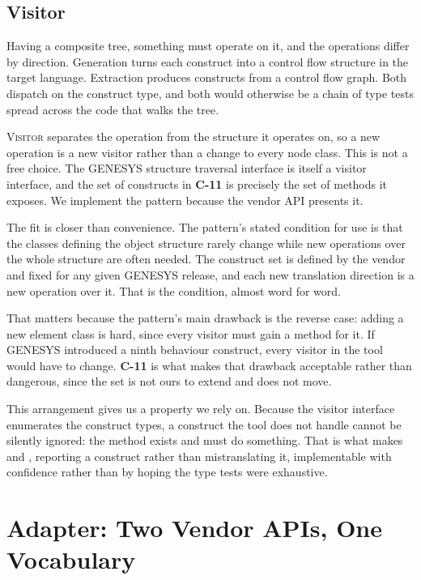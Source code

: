 \subsection{Visitor}

Having a composite tree, something must operate on it, and the operations differ
by direction. Generation turns each construct into a control flow structure in
the target language. Extraction produces constructs from a control flow graph.
Both dispatch on the construct type, and both would otherwise be a chain of type
tests spread across the code that walks the tree.

\textsc{Visitor} separates the operation from the structure it operates on, so a
new operation is a new visitor rather than a change to every node class. This is
not a free choice. The GENESYS structure traversal interface is itself a visitor
interface, and the set of constructs in \textbf{C-11} is precisely the set of
methods it exposes. We implement the pattern because the vendor API presents it.

The fit is closer than convenience. The pattern's stated condition for use is
that the classes defining the object structure rarely change while new
operations over the whole structure are often needed. The construct set is
defined by the vendor and fixed for any given GENESYS release, and each new
translation direction is a new operation over it. That is the condition, almost
word for word.

That matters because the pattern's main drawback is the reverse case: adding a
new element class is hard, since every visitor must gain a method for it. If
GENESYS introduced a ninth behaviour construct, every visitor in the tool would
have to change. \textbf{C-11} is what makes that drawback acceptable rather than
dangerous, since the set is not ours to extend and does not move.

This arrangement gives us a property we rely on. Because the visitor interface
enumerates the construct types, a construct the tool does not handle cannot be
silently ignored: the method exists and must do something. That is what makes
 and , reporting a construct rather than mistranslating it,
implementable with confidence rather than by hoping the type tests were
exhaustive.

\section{Adapter: Two Vendor APIs, One Vocabulary}

